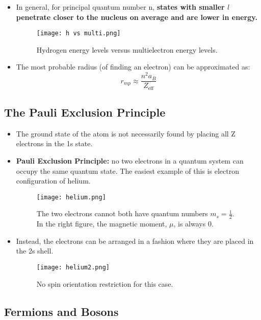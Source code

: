 \documentclass[12pt, letterpaper, twoside]{article}
\begin{document}
\begin{itemize}
    \item In general, for principal quantum number n, \textbf{states with smaller $l$ penetrate closer to the nucleus on average and are lower in energy.}
    \begin{figure}[!ht]
        \centering
        \texttt{[image: h vs multi.png]}
        \caption{Hydrogen energy levels versus multielectron energy levels.}
        \label{fig:h vs multi}
    \end{figure}
    \item The most probable radius (of finding an electron) can be approximated as:
    \begin{equation*}
        r_{mp} \approx \frac{n^2a_B}{Z_{\text{eff}}}
    \end{equation*}
\end{itemize}

\subsection{The Pauli Exclusion Principle}

\begin{itemize}
    \item The ground state of the atom is not necessarily found by placing all Z electrons in the 1s state.
    \item \textbf{Pauli Exclusion Principle:} no two electrons in a quantum system can occupy the same quantum state. The easiest example of this is electron configuration of helium.
    \begin{figure}[!ht]
        \centering
        \texttt{[image: helium.png]}
        \caption{The two electrons cannot both have quantum numbers $m_s = \frac{1}{2}$. In the right figure, the magnetic moment, $\mu$, is always 0.}
    \end{figure}
    \item Instead, the electrons can be arranged in a fashion where they are placed in the 2s shell.
    \begin{figure}[!ht]
        \centering
        \texttt{[image: helium2.png]}
        \caption{No spin orientation restriction for this case.}
    \end{figure}
\end{itemize}

\subsection{Fermions and Bosons}
\end{document}
